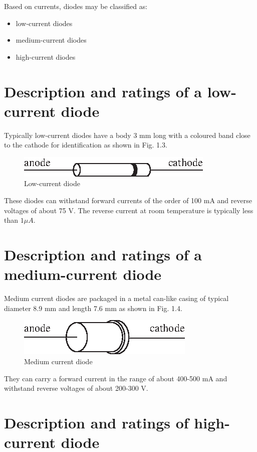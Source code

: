 Based on currents, diodes may be classified as:
\begin{itemize}
\itemsep=1pt
\item low-current diodes
\item medium-current diodes
\item high-current diodes
\end{itemize}

\section{Description and ratings of a low-current diode}\label{sec1.4}

Typically low-current diodes have a body 3 mm long with a coloured
band close to the cathode for identification as shown in Fig. 1.3.
\begin{figure}[H]
\centering
\includegraphics[scale=1.2]{chap1/S3-EE-01-003.eps}
\caption{Low-current diode}\label{fig1.3}
\end{figure}


These diodes can withstand forward currents of the order of 100 mA and
reverse voltages of about 75 V. The reverse current at room
temperature is typically less than $1\mu A$.

\section{Description and ratings of a medium-current diode}\label{sec1.5}

Medium current diodes are packaged in a metal can-like casing of
typical diameter 8.9 mm and length 7.6 mm as shown in Fig. 1.4.
\begin{figure}[H]
\centering
\includegraphics[scale=1.2]{chap1/S3-EE-01-004.eps}
\caption{Medium current diode}\label{fig1.4}
\end{figure}

They can carry a forward current in the range of about 400-500 mA and
withstand reverse voltages of about 200-300 V.

\section{Description and ratings of high-current diode}\label{sec1.6}

